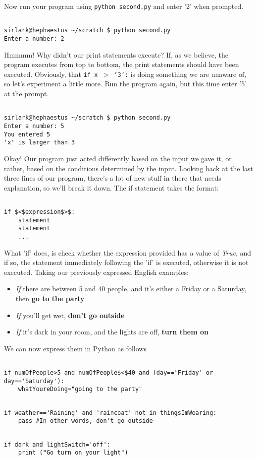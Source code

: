 Now run your program using 
\texttt{python second.py} and enter   '2' when prompted.
\begin{lstlisting}

sirlark@hephaestus ~/scratch $ python second.py 
Enter a number: 2
\end{lstlisting}

Hmmmm! Why didn't our print statements execute? If, as we believe,   the program executes from top to bottom, the print statements should   have been executed. Obviously, that 
\texttt{if x $>$ '3':} is   doing something we are unaware of, so let's experiment a little more.   Run the program again, but this time enter '5' at the prompt.
\begin{lstlisting}

sirlark@hephaestus ~/scratch $ python second.py 
Enter a number: 5
You entered 5
'x' is larger than 3
\end{lstlisting}

Okay! Our program just acted differently based on the input we gave   it, or rather, based on the conditions determined by the input. Looking   back at the last three lines of our program, there's a lot of new stuff   in there that needs explanation, so we'll break it down. The if   statement takes the format:
\begin{lstlisting}

if $<$expression$>$:
    statement
    statement
    ...
\end{lstlisting}

What 'if' does, is check whether the expression provided has a value   of \textit{True}, and if so, the statement immediately following the 'if' is   executed, otherwise it is not executed.    Taking our previously expressed English examples:
\begin{itemize}
	\item \textit{If} there are between 5 and 40 people, and it's either a Friday or a Saturday, then \textbf{ go to the party}
	\item \textit{If} you'll get wet, \textbf{don't go outside}
	\item \textit{If} it's dark in your room, and the lights are off, \textbf{turn them on}
\end{itemize}

We can now express them in Python as follows
\begin{lstlisting}

if numOfPeople>5 and numOfPeople$<$40 and (day=='Friday' or day=='Saturday'):
    whatYoureDoing="going to the party"
\end{lstlisting}
\begin{lstlisting}

if weather=='Raining' and 'raincoat' not in thingsImWearing: 
    pass #In other words, don't go outside
\end{lstlisting}
\begin{lstlisting}

if dark and lightSwitch='off':
	print ("Go turn on your light")
\end{lstlisting}

